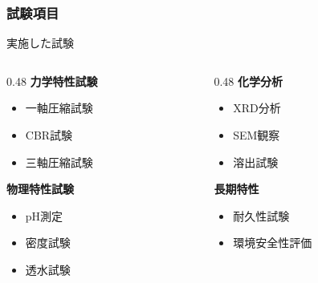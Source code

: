 \documentclass[unicode, 9pt, aspectratio=43]{beamer}
\begin{document}
\begin{refsection}
  \begin{frame}
    \frametitle{試験項目}
    \begin{center}
      \begin{minipage}{0.85\linewidth}
        \begin{block}{実施した試験}
          \begin{columns}
            \begin{column}{0.48\linewidth}
              \textbf{力学特性試験}
              \begin{itemize}
                \item 一軸圧縮試験
                \item CBR試験
                \item 三軸圧縮試験
              \end{itemize}

              \vspace{0.5em}
              \textbf{物理特性試験}
              \begin{itemize}
                \item pH測定
                \item 密度試験
                \item 透水試験
              \end{itemize}
            \end{column}

            \begin{column}{0.48\linewidth}
              \textbf{化学分析}
              \begin{itemize}
                \item XRD分析
                \item SEM観察
                \item 溶出試験
              \end{itemize}

              \vspace{0.5em}
              \textbf{長期特性}
              \begin{itemize}
                \item 耐久性試験
                \item 環境安全性評価
              \end{itemize}
            \end{column}
          \end{columns}
        \end{block}
      \end{minipage}
    \end{center}
  \end{frame}


\end{refsection}
\end{document}
